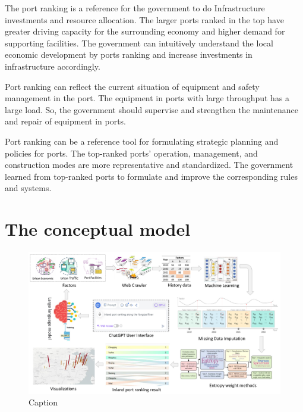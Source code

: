 \documentclass[preprint]{elsarticle}
\begin{document}
The port ranking is a reference for the government to do Infrastructure investments and resource allocation. The larger ports ranked in the top have greater driving capacity for the surrounding economy and higher demand for supporting facilities. The government can intuitively understand the local economic development by ports ranking and increase investments in infrastructure accordingly.

Port ranking can reflect the current situation of equipment and safety management in the port. The equipment in ports with large throughput has a large load. So, the government should supervise and strengthen the maintenance and repair of equipment in ports.

Port ranking can be a reference tool for formulating strategic planning and policies for ports. The top-ranked ports' operation, management, and construction modes are more representative and standardized. The government learned from top-ranked ports to formulate and improve the corresponding rules and systems.

\section{The conceptual model}
\begin{figure}[H]
    \centering
    \includegraphics[width=1.0\textwidth]{pic/autoportranking.pdf}
    \caption{Caption}
    \label{fig:autoportranking}
\end{figure}
\end{document}
